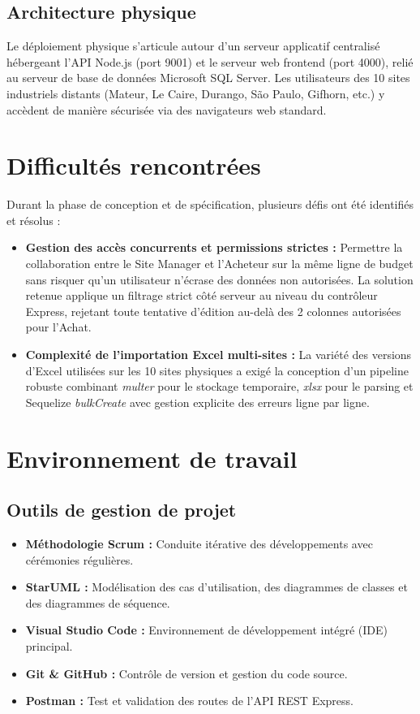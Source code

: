 \subsection{Architecture physique}
Le déploiement physique s'articule autour d'un serveur applicatif centralisé hébergeant l'API Node.js (port 9001) et le serveur web frontend (port 4000), relié au serveur de base de données Microsoft SQL Server. Les utilisateurs des 10 sites industriels distants (Mateur, Le Caire, Durango, São Paulo, Gifhorn, etc.) y accèdent de manière sécurisée via des navigateurs web standard.

\section{Difficultés rencontrées}
Durant la phase de conception et de spécification, plusieurs défis ont été identifiés et résolus :
\begin{itemize}
    \item \textbf{Gestion des accès concurrents et permissions strictes :} Permettre la collaboration entre le Site Manager et l'Acheteur sur la même ligne de budget sans risquer qu'un utilisateur n'écrase des données non autorisées. La solution retenue applique un filtrage strict côté serveur au niveau du contrôleur Express, rejetant toute tentative d'édition au-delà des 2 colonnes autorisées pour l'Achat.
    \item \textbf{Complexité de l'importation Excel multi-sites :} La variété des versions d'Excel utilisées sur les 10 sites physiques a exigé la conception d'un pipeline robuste combinant \textit{multer} pour le stockage temporaire, \textit{xlsx} pour le parsing et Sequelize \textit{bulkCreate} avec gestion explicite des erreurs ligne par ligne.
\end{itemize}

\section{Environnement de travail}

\subsection{Outils de gestion de projet}
\begin{itemize}
    \item \textbf{Méthodologie Scrum :} Conduite itérative des développements avec cérémonies régulières.
    \item \textbf{StarUML :} Modélisation des cas d'utilisation, des diagrammes de classes et des diagrammes de séquence.
    \item \textbf{Visual Studio Code :} Environnement de développement intégré (IDE) principal.
    \item \textbf{Git \& GitHub :} Contrôle de version et gestion du code source.
    \item \textbf{Postman :} Test et validation des routes de l'API REST Express.
\end{itemize}


